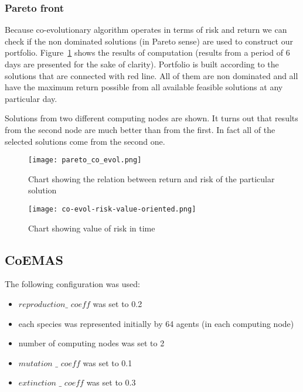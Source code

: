 \subsubsection{Pareto front}

Because co-evolutionary algorithm operates in terms of risk and return we can check if the non dominated solutions (in Pareto sense) are used to construct our portfolio.
Figure~\ref{fig:pareto_co_evol} shows the results of computation (results from a period of 6 days are presented for the sake of clarity). 
Portfolio is built according to the solutions that are connected with red line.
All of them are non dominated and all have the maximum return possible from all available feasible solutions at any particular day.

Solutions from two different computing nodes are shown.
It turns out that results from the second node are much better than from the first.
In fact all of the selected solutions come from the second one.

\begin{figure}[ht]
  \begin{center}
    \texttt{[image: pareto\_co\_evol.png]}
  \end{center}
  \caption{Chart showing the relation between return and risk of the particular solution}
  \label{fig:pareto_co_evol}
\end{figure}


\begin{figure}[ht]
  \begin{center}
    \texttt{[image: co-evol-risk-value-oriented.png]}
  \end{center}
  \caption{Chart showing value of risk in time}
  \label{fig:co_eval_risk}
\end{figure}

\subsection{CoEMAS}

The following configuration was used:
\begin{itemize}
  \item $reproduction\_$ $coeff$ was set to 0.2
  \item each species was represented initially by 64 agents (in each computing node)
  \item number of computing nodes was set to 2
  \item $mutation$ $\_$ $coeff$ was set to 0.1
  \item $extinction$ $\_$ $coeff$ was set to 0.3
\end{itemize}


